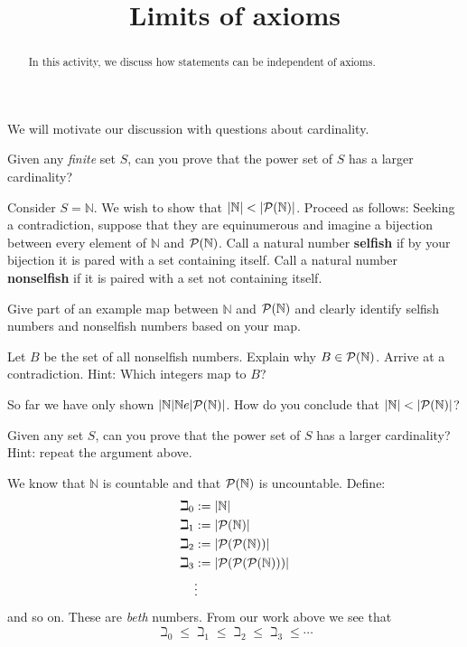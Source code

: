 \documentclass[nooutcomes]{ximera}
\title{Limits of axioms}
\begin{document}
\begin{abstract}
In this activity, we discuss how statements can be independent of axioms.
\end{abstract}
\maketitle 

We will motivate our discussion with questions about cardinality.

\begin{question}
Given any \textit{finite} set $S$, can you prove that the power set of
$S$ has a larger cardinality?
\end{question}

Consider $S=\mathbb{N}$. We wish to show that $|\mathbb{N}|<|\P(\mathbb{N})|$. Proceed as
follows: Seeking a contradiction, suppose that they are equinumerous
and imagine a bijection between every element of $\mathbb{N}$ and
$\P(\mathbb{N})$. Call a natural number \textbf{selfish} if by your bijection
it is pared with a set containing itself. Call a natural number
\textbf{nonselfish} if it is paired with a set not containing itself.

\begin{question}
Give part of an example map between $\mathbb{N}$ and $\P(\mathbb{N})$ and clearly
identify selfish numbers and nonselfish numbers based on your map.
\end{question}

\begin{question}
Let $B$ be the set of all nonselfish numbers. Explain why
$B\in\P(\mathbb{N})$. Arrive at a contradiction. Hint: Which
integers map to $B$?
\end{question}


\begin{question}
So far we have only shown $|\mathbb{N}|\mathbb{N}e|\P(\mathbb{N})|$. How do you conclude that
$|\mathbb{N}|<|\P(\mathbb{N})|$?
\end{question}

\begin{question}
Given any set $S$, can you prove that the power set of $S$ has a
larger cardinality? Hint: repeat the argument above.
\end{question}



We know that $\mathbb{N}$ is countable and that $\P(\mathbb{N})$ is uncountable. Define:
\begin{align*}
\beth_0 &:=|\mathbb{N}|\\
\beth_1 &:=|\P(\mathbb{N})|\\
\beth_2 &:=|\P(\P(\mathbb{N}))|\\
\beth_3 &:=|\P(\P(\P(\mathbb{N})))|\\
        &\vdots
\end{align*}
and so on. These are \textit{beth} numbers. From our work above we see that 
\[
\beth_0 \le \beth_1 \le \beth_2 \le \beth_3 \le \cdots
\]
\end{document}
